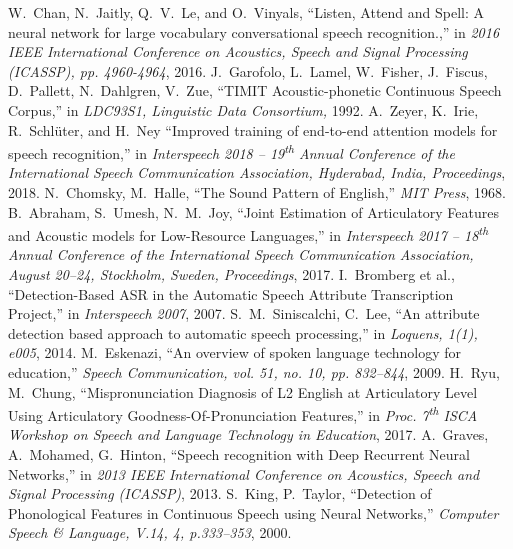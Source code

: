\documentclass[a4paper]{article}
\begin{document}
 \begin{thebibliography}{9}
   W.\ Chan, N.\ Jaitly, Q.\ V.\ Le, and O.\ Vinyals,
   ``Listen, Attend and Spell: A neural network for large vocabulary conversational speech recognition.,''
   in \textit{2016 IEEE International Conference on Acoustics, Speech and Signal Processing (ICASSP), pp. 4960-4964}, 2016.
   J.\ Garofolo, L.\ Lamel, W.\ Fisher, J.\ Fiscus, D.\ Pallett, N.\ Dahlgren, V.\ Zue,
   ``TIMIT Acoustic-phonetic Continuous Speech Corpus,''
   in \textit{LDC93S1, Linguistic Data Consortium,} 1992.
   A.\ Zeyer, K.\ Irie, R.\ Schlüter, and H.\ Ney
   ``Improved training of end-to-end attention models for speech recognition,''
   in \textit{Interspeech 2018 -- 19\textsuperscript{th} Annual Conference of the International Speech Communication Association, Hyderabad, India, Proceedings}, 2018.
   N.\ Chomsky, M.\ Halle,
   ``The Sound Pattern of English,''
   \textit{MIT Press}, 1968.
   B.\ Abraham, S.\ Umesh, N.\ M.\ Joy,
   ``Joint Estimation of Articulatory Features and Acoustic models for Low-Resource Languages,''
   in \textit{Interspeech 2017 -- 18\textsuperscript{th} Annual Conference of the International Speech Communication Association, August 20--24, Stockholm, Sweden, Proceedings}, 2017.
   I.\ Bromberg et al.,
   ``Detection-Based ASR in the Automatic Speech Attribute Transcription Project,''
   in \textit{Interspeech 2007}, 2007.
   S.\ M.\ Siniscalchi, C.\ Lee,
   ``An attribute detection based approach to automatic speech processing,''
   in \textit{Loquens, 1(1), e005}, 2014.
   M.\ Eskenazi,
   ``An overview of spoken language technology for education,''
   \textit{Speech Communication, vol. 51, no. 10, pp. 832–844}, 2009.
   H.\ Ryu, M.\ Chung,
   ``Mispronunciation Diagnosis of L2 English at Articulatory Level Using Articulatory Goodness-Of-Pronunciation Features,''
   in \textit{Proc. 7\textsuperscript{th} ISCA Workshop on Speech and Language Technology in Education}, 2017.
   A.\ Graves, A.\ Mohamed, G.\ Hinton,
   ``Speech recognition with Deep Recurrent Neural Networks,''
   in \textit{2013 IEEE International Conference on Acoustics, Speech and Signal Processing (ICASSP)}, 2013.
   S.\ King, P.\ Taylor,
   ``Detection of Phonological Features in Continuous Speech using Neural Networks,''
   \textit{Computer Speech \& Language, V.14, 4, p.333--353}, 2000.

\end{thebibliography}
\end{document}
